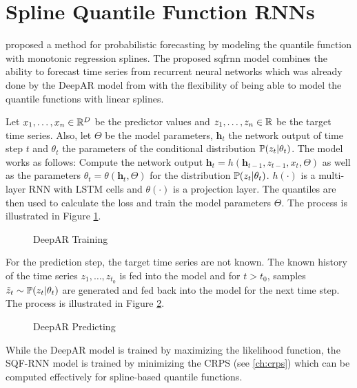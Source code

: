 \section{Spline Quantile Function RNNs}
\label{sec:sqf-rnn}

\Textcite{Gasthaus2019} proposed a method for probabilistic forecasting by modeling 
the quantile function with monotonic regression splines. 
The proposed \gls{sqfrnn} model combines the ability to forecast time series 
from recurrent neural networks which was already done by the DeepAR model from \Textcite{Salinas2017}
with the flexibility of being able to 
model the quantile functions with linear splines. 

Let \(x_1, \ldots, x_n \in \R^D\) be the predictor values and 
\(z_1, \ldots, z_n \in \R\) be the target time series. Also, let \(\Theta\) 
be the model parameters, \(\boldsymbol{h}_t\) the network output of 
time step \(t\) and \(\theta_t\) the parameters of the conditional distribution \(\P(z_t | \theta_t)\).
The model works as follows:
Compute the network output \(\boldsymbol{h}_t = h(\boldsymbol{h}_{t-1}, z_{t-1}, x_t, \Theta)\) 
as well as the parameters \(\theta_t = \theta(\boldsymbol{h}_t, \Theta)\) for the distribution
\(\P(z_t | \theta_t)\). \(h(\cdot)\) is a multi-layer RNN with 
LSTM cells and \(\theta(\cdot)\) is a projection layer. 
The quantiles are then used to calculate the loss and train the model parameters \(\Theta\).
The process is illustrated in Figure \ref{fig:deepar-training}.

\begin{figure}[h]%
    \centering
    
    \caption{DeepAR Training}%
    \label{fig:deepar-training}%
\end{figure}

For the prediction step, the target time series are not known. 
The known history of the time series \(z_1, \ldots, z_{t_0}\) is fed into the 
model and for \(t > t_0\), samples \(\tilde{z}_t \sim \P(z_t | \theta_t)\) 
are generated and fed back into the model for the next time step.
The process is illustrated in Figure \ref{fig:deepar-predicting}.

\begin{figure}[h]%
    \centering
    
    \caption{DeepAR Predicting}%
    \label{fig:deepar-predicting}%
\end{figure}

While the DeepAR model is trained by maximizing the likelihood function, 
the SQF-RNN model is trained by minimizing the CRPS (see \ref{ch:crps}) 
which can be computed effectively for spline-based quantile functions.


